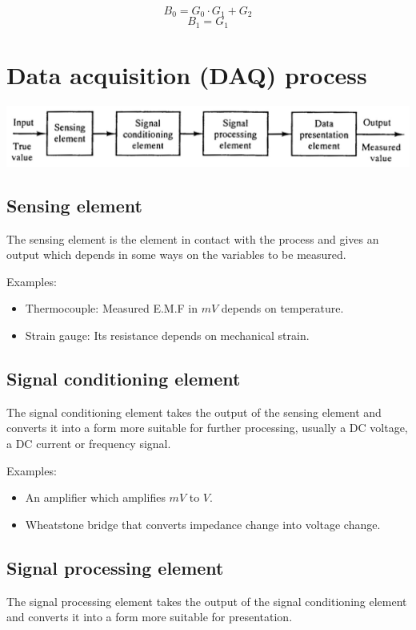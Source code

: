 \documentclass[11pt]{article}
\begin{document}
\[B_0 = G_0 \cdot G_1 + G_2\]
\[B_1 = G_1\]

\section{Data acquisition (DAQ) process}
\label{sec:org67be64b}
\begin{center}
\includegraphics[width=.9\linewidth]{./images/data-acquisition-process.png}
\end{center}

\subsection{Sensing element}
\label{sec:orgaef3079}
The sensing element is the element in contact with the process and gives an output which depends in some ways on the variables to be measured.

Examples:
\begin{itemize}
\item Thermocouple: Measured E.M.F in \(\unit{mV}\) depends on temperature.
\item Strain gauge: Its resistance depends on mechanical strain.
\end{itemize}

\subsection{Signal conditioning element}
\label{sec:org0a4f610}
The signal conditioning element takes the output of the sensing element and converts it into a form more suitable for further processing, usually a DC voltage, a DC current or frequency signal.

Examples:
\begin{itemize}
\item An amplifier which amplifies \(\unit{mV}\) to \(\unit{V}\).
\item Wheatstone bridge that converts impedance change into voltage change.
\end{itemize}

\subsection{Signal processing element}
\label{sec:org56c3069}
The signal processing element takes the output of the signal conditioning element and converts it into a form more suitable for presentation.
\end{document}
